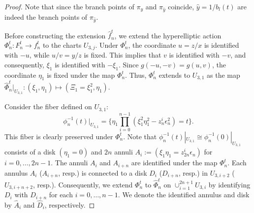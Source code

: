 \documentclass[10pt,a4paper,reqno]{amsart}
\theoremstyle{definition}
\numberwithin{equation}{section}
\numberwithin{figure}{section}
\newcommand{\C}{\mathbb{C}}
\newcommand{\ep}{\epsilon}
\newcommand{\arrowr}{\rightarrow}
\begin{document}
\begin{proof}
Note that since the branch points of $\pi_y$ and $\pi_{\hat{y}}$ coincide, $\hat{y}=1/b_l(t)$ are indeed the branch points of $\pi_{\hat{y}}$.

Before constructing the extension $\hat{f}_n^t$, we extend the hyperelliptic action $\Phi_n^t: F_n^t \arrowr f_n^t$ to the charts $U_{3,j}$.
Under $\Phi_n^t$, the coordinate $u=z/x$ is identified with $-u$, while $u/v=y/z$ is fixed. 
This implies that $v$ is identified with $-v$, and consequently, $\xi_1$ is identified with $-\xi_1$.
Since $g(-u,-v)=g(u,v)$, the coordinate $\eta_1$ is fixed under the map $\Phi_n^t$.
Thus, $\Phi_n^t$ extends to $U_{3,1}$ as the map $\hat{\Phi}_n^t|_{U_{3,1}}: (\xi_1, \eta_1) \mapsto (\Xi_1=\xi_1^2, \eta_1)$.

Consider the fiber defined on $U_{3,1}$: 
\[\phi_n^{-1}(t)|_{U_{3,1}}=\{ \eta_1 \prod_{i=0}^{n-1}(\xi_1^2 \eta_1^2- z_{n}^i {\ep_n^{2}})=t\} . \]
This fiber is clearly preserved under $\Phi_n^t$.
Note that $\phi_n^{-1}(t)|_{U_{3,1}} \cong \phi_n^{-1}(0)|_{U_{3,1}}$ consists of a disk $(\eta_1=0)$ and 
$2n$ annuli $A_i:=(\xi_1 \eta_1=z_{2n}^i {\ep_n})$ for $i=0,\dots, 2n-1$. 
The annuli $A_i$ and $A_{i+n}$ are identified under the map $\Phi_n^t$.
Each annulus $A_i$ ($A_{i+n}$, resp.) is connected to a disk $D_i$ ($D_{i+n}$, resp.) in $U_{3,i+2}$ ($U_{3,i+n+2}$, resp.).
Consequently, we extend $\Phi_n^t$ to $\hat{\Phi}_n^t$ on $\cup_{i=1}^{2n+1} U_{3,i}$ by identifying $D_i$ with $D_{i+n}$ for each $i=0,\dots, n-1$.
We denote the identified annulus and disk by $\hat{A}_i$ and $ \hat{D}_i$, respectively.



\end{proof}
\end{document}
